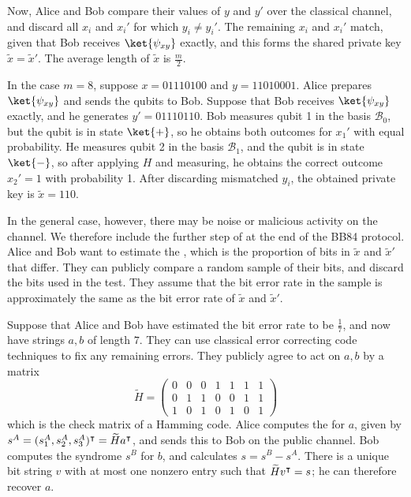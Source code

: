 Now, Alice and Bob compare their values of $y$ and $y'$ over the classical channel, and discard all $x_i$ and $x_i'$ for which $y_i \neq y_i'$.
The remaining $x_i$ and $x_i'$ match, given that Bob receives $\ket{\psi_{xy}}$ exactly, and this forms the shared private key $\widetilde x = \widetilde x'$.
The average length of $\widetilde x$ is $\frac{m}{2}$.

In the case $m = 8$, suppose $x = 01110100$ and $y = 11010001$.
Alice prepares $\ket{\psi_{xy}}$ and sends the qubits to Bob.
Suppose that Bob receives $\ket{\psi_{xy}}$ exactly, and he generates $y' = 01110110$.
Bob measures qubit 1 in the basis $\mathcal B_0$, but the qubit is in state $\ket{+}$, so he obtains both outcomes for $x_1'$ with equal probability.
He measures qubit 2 in the basis $\mathcal B_1$, and the qubit is in state $\ket{-}$, so after applying $H$ and measuring, he obtains the correct outcome $x_2' = 1$ with probability 1.
After discarding mismatched $y_i$, the obtained private key is $\widetilde x = 110$.

In the general case, however, there may be noise or malicious activity on the channel.
We therefore include the further step of  at the end of the BB84 protocol.
Alice and Bob want to estimate the , which is the proportion of bits in $\widetilde x$ and $\widetilde x'$ that differ.
They can publicly compare a random sample of their bits, and discard the bits used in the test.
They assume that the bit error rate in the sample is approximately the same as the bit error rate of $\widetilde x$ and $\widetilde x'$.

Suppose that Alice and Bob have estimated the bit error rate to be $\frac{1}{7}$, and now have strings $a, b$ of length $7$.
They can use classical error correcting code techniques to fix any remaining errors.
They publicly agree to act on $a, b$ by a matrix
\[ \widetilde H = \begin{pmatrix}
    0 & 0 & 0 & 1 & 1 & 1 & 1 \\
    0 & 1 & 1 & 0 & 0 & 1 & 1 \\
    1 & 0 & 1 & 0 & 1 & 0 & 1
\end{pmatrix} \]
which is the check matrix of a Hamming code.
Alice computes the  for $a$, given by $s^A = (s_1^A, s_2^A, s_3^A)^\intercal = \widetilde H a^\intercal$, and sends this to Bob on the public channel.
Bob computes the syndrome $s^B$ for $b$, and calculates $s = s^B - s^A$.
There is a unique bit string $v$ with at most one nonzero entry such that $\widetilde H v^\intercal = s$; he can therefore recover $a$.

